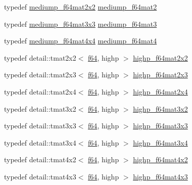 \begin{CompactItemize}
typedef \hyperlink{group__gtc__type__precision_gcfa9f872c78d9e8b8e6c5dd0088db8fc}{mediump\_\-f64mat2x2} \hyperlink{group__gtc__type__precision_ga7eac0340d2aaf670ec4dfbd1826fd35}{mediump\_\-f64mat2}
\item 
typedef \hyperlink{group__gtc__type__precision_g871b69a221dae7461aa746e6e6d372fc}{mediump\_\-f64mat3x3} \hyperlink{group__gtc__type__precision_ge38a4a0b57e25d9cbb153dcaab9432ec}{mediump\_\-f64mat3}
\item 
typedef \hyperlink{group__gtc__type__precision_g941e42a0b337b5c8ad9c324aaa6b2ad5}{mediump\_\-f64mat4x4} \hyperlink{group__gtc__type__precision_g2763f655bfe2141a014e66d26a9d2f18}{mediump\_\-f64mat4}
\item 
typedef detail::tmat2x2$<$ \hyperlink{group__gtc__type__precision_g2bba392e555124b36cde6abba349bab3}{f64}, highp $>$ \hyperlink{group__gtc__type__precision_g4babca568fc88f185620c02e4fdac0d8}{highp\_\-f64mat2x2}
\item 
typedef detail::tmat2x3$<$ \hyperlink{group__gtc__type__precision_g2bba392e555124b36cde6abba349bab3}{f64}, highp $>$ \hyperlink{group__gtc__type__precision_gfb5b42b29b3bd7f1605483223fa35312}{highp\_\-f64mat2x3}
\item 
typedef detail::tmat2x4$<$ \hyperlink{group__gtc__type__precision_g2bba392e555124b36cde6abba349bab3}{f64}, highp $>$ \hyperlink{group__gtc__type__precision_g72fae79e6633cbc6bf691f69278b36d3}{highp\_\-f64mat2x4}
\item 
typedef detail::tmat3x2$<$ \hyperlink{group__gtc__type__precision_g2bba392e555124b36cde6abba349bab3}{f64}, highp $>$ \hyperlink{group__gtc__type__precision_g5cdc9d6fb9ce07e5485c4e2db919ce7e}{highp\_\-f64mat3x2}
\item 
typedef detail::tmat3x3$<$ \hyperlink{group__gtc__type__precision_g2bba392e555124b36cde6abba349bab3}{f64}, highp $>$ \hyperlink{group__gtc__type__precision_gf520a9307867c632408029a53af3e375}{highp\_\-f64mat3x3}
\item 
typedef detail::tmat3x4$<$ \hyperlink{group__gtc__type__precision_g2bba392e555124b36cde6abba349bab3}{f64}, highp $>$ \hyperlink{group__gtc__type__precision_g4144f547189dd7e52b4dd282f41a1cd1}{highp\_\-f64mat3x4}
\item 
typedef detail::tmat4x2$<$ \hyperlink{group__gtc__type__precision_g2bba392e555124b36cde6abba349bab3}{f64}, highp $>$ \hyperlink{group__gtc__type__precision_gbe9bc3680e7d83a7b34297da518a8117}{highp\_\-f64mat4x2}
\item 
typedef detail::tmat4x3$<$ \hyperlink{group__gtc__type__precision_g2bba392e555124b36cde6abba349bab3}{f64}, highp $>$ \hyperlink{group__gtc__type__precision_g0264562b4667b8073b7708efc2280691}{highp\_\-f64mat4x3}

\end{CompactItemize}
